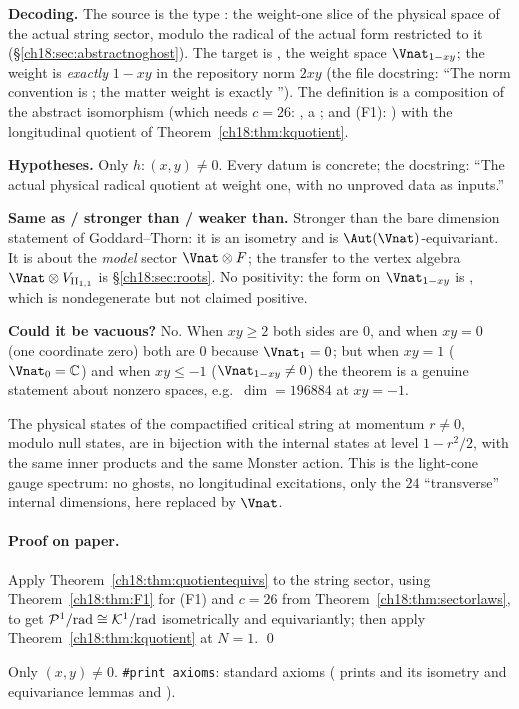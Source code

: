 \begin{dictionary}
\textbf{Decoding.}  The source is the type : the weight-one slice of
the physical space of the actual string sector, modulo the radical of the actual form restricted to it
(\S\ref{ch18:sec:abstractnoghost}).  The target is , the weight space
$\Vnat_{1-xy}$; the weight is \emph{exactly} $1-xy$ in the repository norm $2xy$ (the file docstring:
``The norm convention is ; the matter weight is exactly '').  The definition is a
composition of the abstract isomorphism  (which needs $c=26$:
, a ; and (F1): ) with the
longitudinal quotient of Theorem~\ref{ch18:thm:kquotient}.

\textbf{Hypotheses.}  Only $h:(x,y)\neq0$.  Every datum is concrete; the docstring: ``The actual physical
radical quotient at weight one, with no unproved data as inputs.''

\textbf{Same as / stronger than / weaker than.}  Stronger than the bare dimension statement of
Goddard--Thorn: it is an isometry and is $\Aut(\Vnat)$-equivariant.  It is about the \emph{model} sector
$\Vnat\otimes F$; the transfer to the vertex algebra $\Vnat\otimes V_{\chXVIIIII}$ is
\S\ref{ch18:sec:roots}.  No positivity: the form on $\Vnat_{1-xy}$ is , which is nondegenerate
but not claimed positive.

\textbf{Could it be vacuous?}  No.  When $xy\ge2$ both sides are $0$, and when $xy=0$ (one coordinate zero) both are
$0$ because $\Vnat_1=0$; but when $xy=1$ ($\Vnat_0=\mathbb C$) and when $xy\le-1$ ($\Vnat_{1-xy}\neq0$) the theorem is a genuine
statement about nonzero spaces, e.g.\ $\dim=196884$ at $xy=-1$.
\end{dictionary}
\begin{physics}
The physical states of the compactified critical string at momentum $r\neq0$, modulo null states, are
in bijection with the internal states at level $1-r^2/2$, with the same inner products and the same
Monster action.  This is the light-cone gauge spectrum: no ghosts, no longitudinal excitations, only
the $24$ ``transverse'' internal dimensions, here replaced by $\Vnat$.
\end{physics}
\paragraph{Proof on paper.}  Apply Theorem~\ref{ch18:thm:quotientequivs} to the string sector, using
Theorem~\ref{ch18:thm:F1} for (F1) and $c=26$ from Theorem~\ref{ch18:thm:sectorlaws}, to get
$\mathcal{P}^1/\mathrm{rad}\cong\mathcal{K}^1/\mathrm{rad}$ isometrically and equivariantly; then apply Theorem~\ref{ch18:thm:kquotient} at
$N=1$. \qed
\begin{status}
Only $(x,y)\neq0$.  \texttt{\#print axioms}: standard axioms (
prints  and its isometry and equivariance lemmas and
).
\end{status}

